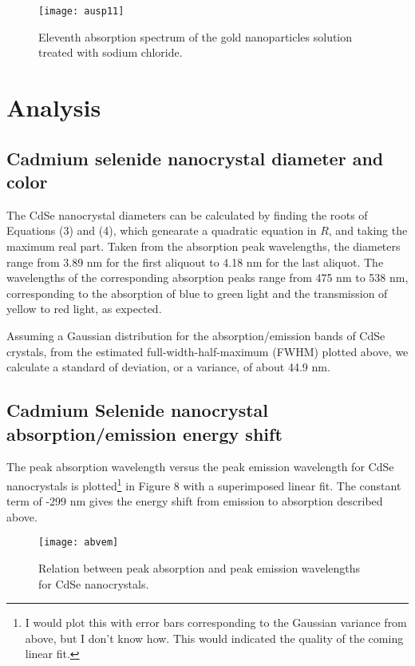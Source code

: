 \documentclass{article}
\begin{document}
\begin{figure}[H]
\texttt{[image: ausp11]}
\centering
\caption{Eleventh absorption spectrum of the gold nanoparticles solution treated with 
sodium chloride.}
\end{figure}

\section{Analysis}

\subsection{Cadmium selenide nanocrystal diameter and color}

The CdSe nanocrystal diameters can be calculated by finding the roots of
Equations (3) and (4), 
which genearate a quadratic equation in $R$, and taking the maximum real part.
Taken from the absorption peak wavelengths, the diameters range from 3.89 nm for the
first aliquout to 4.18 nm for the last aliquot. The wavelengths of the corresponding 
absorption peaks range from 475 nm to 538 nm, corresponding to the absorption of
blue to green light and the transmission of yellow to red light, as expected.

Assuming a Gaussian distribution for the absorption/emission bands of CdSe crystals,
from the estimated full-width-half-maximum (FWHM) plotted above, we calculate a standard 
of deviation, or a variance, of about 44.9 nm.

\subsection{Cadmium Selenide nanocrystal absorption/emission energy shift}

The peak absorption wavelength versus the peak emission wavelength for CdSe nanocrystals
is plotted\footnote{I would plot this with error bars corresponding to the Gaussian variance 
from above, but I don't know how. This would indicated the quality of the coming linear fit.}
in Figure 8 with a superimposed linear fit. The constant term of -299 nm gives 
the energy shift from emission to absorption described above.

\begin{figure}[H]
\texttt{[image: abvem]}
\centering
\caption{Relation between peak absorption and peak emission wavelengths for CdSe
nanocrystals.}
\end{figure}
\end{document}
